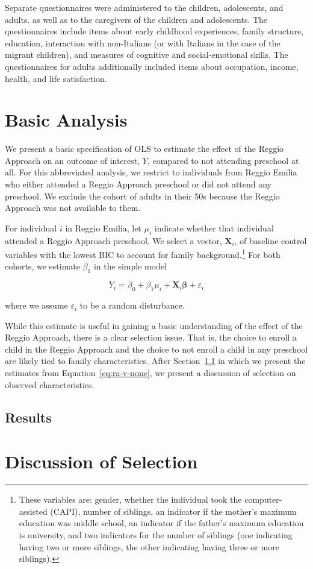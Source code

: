 Separate questionnaires were administered to the children, adolescents, and adults. as well as to the caregivers of the children and adolescents. The questionnaires include items about early childhood experiences, family structure, education, interaction with non-Italians (or with Italians in the case of the migrant children), and measures of cognitive and social-emotional skills. The questionnaires for adults additionally included items about occupation, income, health, and life satisfaction. 

\section{Basic Analysis}
\label{sec:methodology}

We present a basic specification of OLS to estimate the effect of the Reggio Approach on an outcome of interest, $Y$, compared to not attending preschool at all. For this abbreviated analysis, we restrict to individuals from Reggio Emilia who either attended a Reggio Approach preschool or did not attend any preschool. We exclude the cohort of adults in their 50s because the Reggio Approach was not available to them.

For individual $i$ in Reggio Emilia, let $\mu_i$ indicate whether that individual attended a Reggio Approach preschool. We select a vector, $\bm{X}_i$, of baseline control variables with the lowest BIC to account for family background.\footnote{These variables are: gender, whether the individual took the computer-assisted (CAPI), number of siblings, an indicator if the mother's maximum education was middle school, an indicator if the father's maximum education is university, and two indicators for the number of siblings (one indicating having two or more siblings, the other indicating having three or more siblings).} For both cohorts, we estimate $\beta_1$ in the simple model

\begin{equation}
	Y_i = \beta_0 + \beta_1 \mu_i + \bm{X}_i\bm{\beta} + \varepsilon_i
	\label{eq:ra-v-none}
\end{equation}

\noindent where we assume $\varepsilon_i$ to be a random disturbance. 

While this estimate is useful in gaining a basic understanding of the effect of the Reggio Approach, there is a clear selection issue. That is, the choice to enroll a child in the Reggio Approach and the choice to not enroll a child in any preschool are likely tied to family characteristics. After Section~\ref{sec:results} in which we present the estimates from Equation~\eqref{eq:ra-v-none}, we present a discussion of selection on observed characteristics.

\subsection{Results}
\label{sec:results}


\section{Discussion of Selection}
\label{sec:selection}



\clearpage

%
%


